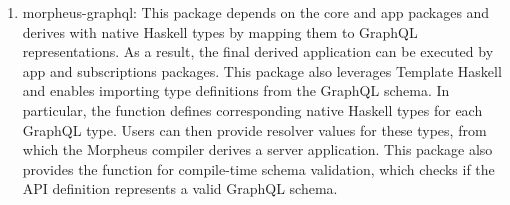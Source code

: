 \begin{frame}
\begin{enumerate}
  \item morpheus-graphql: This package depends on the core and app packages and derives  with native Haskell types by mapping them to GraphQL representations. As a result, the final derived application can be executed by app and subscriptions packages.
  This package also leverages Template Haskell and enables importing type definitions from the GraphQL schema. In particular, the  function defines corresponding native Haskell types for each GraphQL type. Users can then provide resolver values for these types, from which the Morpheus compiler derives a server application. 
  This package also provides the function  for compile-time schema validation, which checks if the API definition represents a valid GraphQL schema.

\end{enumerate}

\end{frame}

\begin{frame}

\end{frame}
